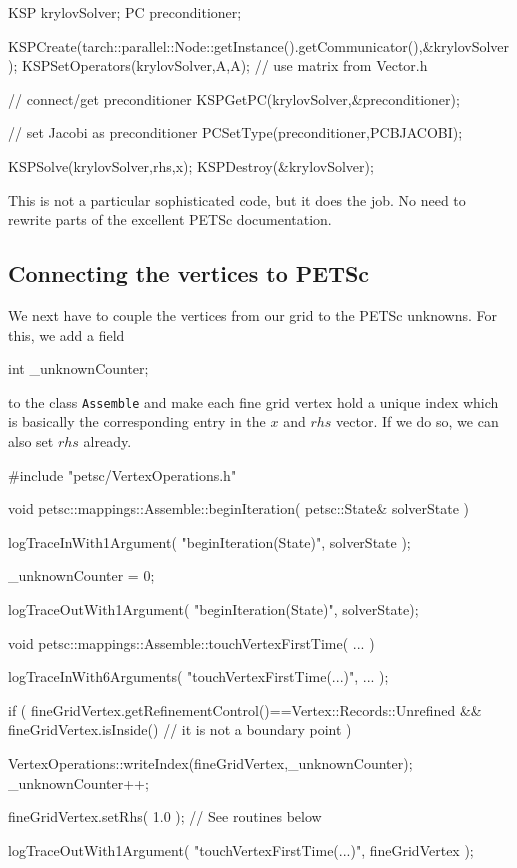 \begin{code}
KSP krylovSolver;
PC  preconditioner;

KSPCreate(tarch::parallel::Node::getInstance().getCommunicator(),&krylovSolver);
KSPSetOperators(krylovSolver,A,A); // use matrix from Vector.h

// connect/get preconditioner
KSPGetPC(krylovSolver,&preconditioner);

// set Jacobi as preconditioner
PCSetType(preconditioner,PCBJACOBI);

KSPSolve(krylovSolver,rhs,x);
KSPDestroy(&krylovSolver);
\end{code}

\noindent
This is not a particular sophisticated code, but it does the job. 
No need to rewrite parts of the excellent PETSc documentation.

\subsection{Connecting the vertices to PETSc}

We next have to couple the vertices from our grid to the PETSc unknowns. 
For this, we add a field     

\begin{code}
int  _unknownCounter;
\end{code}

\noindent
to the class \texttt{Assemble} and make each fine grid vertex hold a unique
index which is basically the corresponding entry in the $x$ and $rhs$ vector.
If we do so, we can also set $rhs$ already.

\begin{code}
#include "petsc/VertexOperations.h"

void petsc::mappings::Assemble::beginIteration(
  petsc::State&  solverState
) {
  logTraceInWith1Argument( "beginIteration(State)", solverState );

  _unknownCounter = 0;

  logTraceOutWith1Argument( "beginIteration(State)", solverState);
}

void petsc::mappings::Assemble::touchVertexFirstTime(
  ...
) {
  logTraceInWith6Arguments( "touchVertexFirstTime(...)", ... );

  if (
    fineGridVertex.getRefinementControl()==Vertex::Records::Unrefined
    &&
    fineGridVertex.isInside() // it is not a boundary point
  ) {
    VertexOperations::writeIndex(fineGridVertex,_unknownCounter);
    _unknownCounter++;
    
    fineGridVertex.setRhs( 1.0 ); // See routines below
  }

  logTraceOutWith1Argument( "touchVertexFirstTime(...)", fineGridVertex );
}
\end{code}

